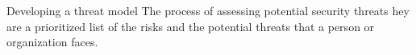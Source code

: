 Developing a threat model 
  The process of assessing potential security threats
  hey are a prioritized list of the risks and the potential threats that a person or organization faces.